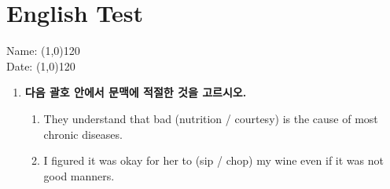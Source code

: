 \documentclass[a4wide,14pt]{extarticle}
\begin{document}


\section*{English Test}
Name: \line(1,0){120} \, %
\\Date: \line(1,0){120} \,




\begin{enumerate}[label=$\spadesuit$]

%
%
%


\item \textbf{다음 괄호 안에서 문맥에 적절한 것을 고르시오.}

	\begin{enumerate}[label={\textbf{\arabic*.}}]
		 \item They understand that bad (nutrition / courtesy) is the cause of most chronic diseases.

		 \item I figured it was okay for her to (sip / chop) my wine even if it was not good manners.


\end{enumerate}
\end{enumerate}
\end{document}
